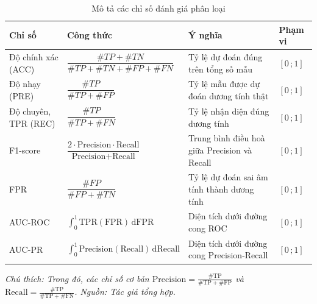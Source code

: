 \documentclass[a4paper,oneside]{book} %
\theoremstyle{plain}
\theoremstyle{plain}
\theoremstyle{nonumberplain}
\begin{document}
\begin{table}[H]
	\centering\fontsize{11pt}{14pt}\selectfont
	\caption{Mô tả các chỉ số đánh giá phân loại}\label{tab:index_phanloai}
	\begin{tabular*}{\columnwidth}{@{\extracolsep\fill}p{4cm}lp{5cm}l@{\extracolsep\fill}} 
		\toprule
		\textbf{Chỉ số} & \textbf{Công thức}                                                                         & \textbf{Ý nghĩa}                             & \textbf{Phạm vi} \\ \midrule
		Độ chính xác (ACC) & $\dfrac{\#TP + \#TN}{\#TP + \#TN + \#FP + \#FN}$                                            & Tỷ lệ dự đoán đúng trên tổng số mẫu          &     $[0\,;1]$      \\
	Độ nhạy	(PRE) & $\dfrac{\#TP}{\#TP + \#FP}$                                                                 & Tỷ lệ mẫu được dự đoán dương tính thật & $[0\,;1]$      \\
	Độ chuyên, TPR (REC)    & $\dfrac{\#TP}{\#TP + \#FN}$                                                                 & Tỷ lệ nhận diện đúng dương tính                &     $[0\,;1]$      \\
		F1-score        & $\dfrac{2 \cdot \text{Precision} \cdot \text{Recall}}
		{\text{Precision} + \text{Recall}}$ & Trung bình điều hoà giữa Precision và Recall &     $[0\,;1]$      \\
		FPR             & $\dfrac{\#FP}{\#FP + \#TN}$                                                                 & Tỷ lệ dự đoán sai âm tính thành dương tính    &     $[0\,;1]$      \\
		AUC-ROC             & $\displaystyle\int_{0}^{1} \text{TPR}(\text{FPR}) \mathrm{\,d}\text{FPR}$                               & Diện tích dưới đường cong ROC               &     $[0\,;1]$      \\
		AUC-PR          & $\displaystyle\int_{0}^{1} \text{Precision}(\text{Recall}) \mathrm{\,d}\text{Recall}$        & Diện tích dưới đường cong Precision-Recall   &     $[0\,;1]$      \\ \bottomrule
	\end{tabular*}
	\begin{minipage}{\textwidth}\fontsize{11pt}{14pt}\selectfont\it
	Chú thích: Trong đó, các chỉ số cơ bản $
	\mathrm{Precision} = \frac{\mathrm{\#TP}}{\mathrm{\#TP} + \mathrm{\#FP}}$ và $	\mathrm{Recall} = \frac{\mathrm{\#TP}}{\mathrm{\#TP} + \mathrm{\#FN}}$. Nguồn: Tác giả tổng hợp.
\end{minipage}

\end{table}
\end{document}
